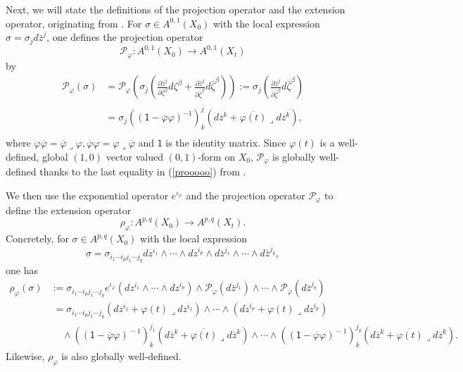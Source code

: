 \documentclass[12pt]{amsart}
\numberwithin{equation}{section}
\theoremstyle{definition}
\theoremstyle{definition}
\theoremstyle{definition}
\newcommand{\dz}{d \bar{z}}
\renewcommand{\1}{\mathsf{1}}
\newcommand{\lc}{\lrcorner}
\newcommand{\lk}{\left(}
\newcommand{\rk}{\right)}
\renewcommand{\>}{\rightarrow}
\def\v{\varphi}
\def\l{\lrcorner}
\theoremstyle{plain} %
\theoremstyle{plain} %
\theoremstyle{plain} %
\begin{document}
    Next, we will state the definitions of the projection operator and the extension operator, originating from \cite{WZ20,Xi21b}. For $\sigma\in A^{0,1}(X_0)$ with the local expression $\sigma=\sigma_j\dz^j$, one defines the projection operator $$\mathcal P_{\v}:A^{0,1}(X_0)\longrightarrow A^{0,1}(X_t)$$by
	\begin{equation}\label{prooooo}
		\begin{aligned}
			\mathcal P_{\v}\left(\sigma\right)&=\mathcal P_{\v}\left(\sigma_j\left(\frac{\partial \bar{z}^{j}}{\partial \zeta^ {\beta}}d \zeta^ {\beta}+\frac{\partial \bar{z}^{j}}{\partial \bar{\zeta}^ {\beta}} d \bar{\zeta}^ {\beta}\right)\right)
			:=\sigma_j \left(\frac{\partial \bar{z}^{j}}{\partial \bar{\zeta}^ {\beta}} d \bar{\zeta}^ {\beta}\right)\\
			&=\sigma_j\left({\left(\1-\overline\varphi\varphi\right)}^{-1}\right)^{\overline j}_{\bar k}\left(d\overline{z}^{k}+\overline{\varphi(t)}\lc
			d\overline{z}^{k}\right),\\
		\end{aligned}
	\end{equation}
	where $\varphi \overline{\varphi} =
	\overline{\varphi} \lc \varphi, \overline{\varphi} \varphi = \varphi
	\lc \overline{\varphi}$ and $\1$ is the identity matrix.
	Since $\varphi(t)$ is a well-defined, global $(1,0)$ vector valued $(0,1)$-form on $X_0$, $\mathcal P_\v$ is globally well-defined thanks to the last equality in (\ref{prooooo}) from \cite[(2.18)]{RZ18}.  
    
    We then use  the exponential operator
	$e^{\iota_\v}$ and the projection operator $\mathcal P_\v$ to define the extension operator $$\rho_\varphi: A^{p,q}(X_0)\longrightarrow A^{p,q}(X_t).$$ Concretely,  for $\sigma\in A^{p,q}(X_0)$ with the local expression $$\sigma=\sigma_{i_1\cdots i_p {j}_1\cdots {j}_{q}}d z^{i_{1}} \wedge \cdots \wedge d z^{i_{p}} \wedge d \bar{z}^{j_{1}} \wedge \cdots \wedge d \bar{z}^{j_{q}},$$ one has
	\begin{equation}\label{ccccc}
		\begin{aligned}
			\rho_\varphi\left(\sigma\right)
			&:=\sigma_{i_1\cdots i_p {j}_1\cdots {j}_{q}}e^{\iota_\varphi}\left(d z^{i_{1}} \wedge \cdots \wedge d z^{i_{p}}\right) \wedge \mathcal P_\v \left(\dz^{j_1}\right)\wedge\cdots\wedge \mathcal P_\v \left(\dz^{j_q}\right)\\
			&\;= \sigma_{i_1\cdots i_p {j}_1\cdots {j}_{q}}\left(d z^{i_{1}}+{\varphi(t)}\l  d z^{i_{1}}\right) \wedge \cdots \wedge\left(d z^{i_{p}}+{\varphi(t)}\l  d z^{i_{p}}\right)\\&\quad\, \wedge 	
			\lk \lk \1- \overline{\varphi} \varphi \rk^{\!-1}
			\rk^{ {j}_{1}}_{\bar k} \left(d\overline{z}^{k}+\overline{\varphi(t)}\lc
			d\overline{z}^{k}\right)\wedge\cdots\wedge\lk \lk \1- \overline{\varphi} \varphi \rk^{\!-1}
			\rk^{ {j}_{q} }_{\bar k} \left(d\overline{z}^{k}+\overline{\varphi(t)}\lc
			d\overline{z}^{k}\right).
		\end{aligned}
	\end{equation}
	Likewise, $\rho_\varphi$ is also globally well-defined.
	
\end{document}
